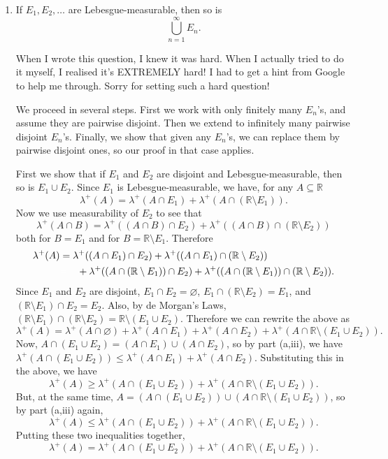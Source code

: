 \documentclass{article}
\let\take\setminus
\begin{document}
\begin{enumerate}
\begin{enumerate}
\begin{enumerate}
					\item If $E_1,E_2,\hdots$ are Lebesgue-measurable, then so is
						\[\bigcup_{n=1}^\infty E_n.\]
					
						{{\color{red}When I wrote this question, I knew it was hard. When I actually tried to do it myself, I realised it's EXTREMELY hard! I had to get a hint from Google to help me through. Sorry for setting such a hard question!\bigskip}\color{blue}
						
						We proceed in several steps. First we work with only finitely many $E_n$'s, and assume they are pairwise disjoint. Then we extend to infinitely many pairwise disjoint $E_n$'s. Finally, we show that given any $E_n$'s, we can replace them by pairwise disjoint ones, so our proof in that case applies.\medskip
						
						
							First we show that if $E_1$ and $E_2$ are disjoint and Lebesgue-measurable, then so is $E_1\cup E_2$. Since $E_1$ is Lebesgue-measurable, we have, for any $A\subseteq \mathbb{R}$
							\[\lambda^+(A)=\lambda^+(A\cap E_1)+\lambda^+(A\cap (\mathbb{R}\take E_1)).\]
							Now we use measurability of $E_2$ to see that
							\[\lambda^+(A\cap B)= \lambda^+((A\cap B)\cap E_2)+\lambda^+((A\cap B)\cap(\mathbb{R}\take E_2))\]
							both for $B=E_1$ and for $B=\mathbb{R}\take E_1$. Therefore
							\begin{align*}
								\lambda^+(A)&= \lambda^+((A\cap E_1)\cap E_2)+\lambda^+((A\cap E_1)\cap(\mathbb{R}\take E_2))\\
								&{\color{white} =\quad} +\lambda^+((A\cap (\mathbb{R}\take E_1))\cap E_2)+\lambda^+((A\cap (\mathbb{R}\take E_1))\cap(\mathbb{R}\take E_2)).
							\end{align*}
							Since $E_1$ and $E_2$ are disjoint, $E_1\cap E_2=\varnothing$, $E_1\cap (\mathbb{R}\take E_2)=E_1$, and $(\mathbb{R}\take E_1)\cap E_2=E_2$. Also, by de Morgan's Laws, $(\mathbb{R}\take E_1)\cap (\mathbb{R}\take E_2)=\mathbb{R}\take (E_1\cup E_2)$. Therefore we can rewrite the above as
							\[\lambda^+(A)=\lambda^+(A\cap\varnothing)+\lambda^+(A\cap E_1)+\lambda^+(A\cap E_2)+\lambda^+(A\cap\mathbb{R}\take(E_1\cup E_2)).\]
							Now, $A\cap(E_1\cup E_2)=(A\cap E_1)\cup(A\cap E_2)$, so by part (a,iii), we have $\lambda^+(A\cap(E_1\cup E_2))\leq \lambda^+(A\cap E_1)+\lambda^+(A\cap E_2)$. Substituting this in the above, we have
							\[\lambda^+(A)\geq \lambda^+(A\cap(E_1\cup E_2))+\lambda^+(A\cap\mathbb{R}\take(E_1\cup E_2)).\]
							But, at the same time, $A=(A\cap(E_1\cup E_2))\cup(A\cap\mathbb{R}\take(E_1\cup E_2))$, so by part (a,iii) again,
							\[\lambda^+(A)\leq  \lambda^+(A\cap(E_1\cup E_2))+\lambda^+(A\cap\mathbb{R}\take(E_1\cup E_2)).\]
							Putting these two inequalities together,
							\[\lambda^+(A)= \lambda^+(A\cap(E_1\cup E_2))+\lambda^+(A\cap\mathbb{R}\take(E_1\cup E_2)).\]
							
}
\end{enumerate}
\end{enumerate}
\end{enumerate}
\end{document}
